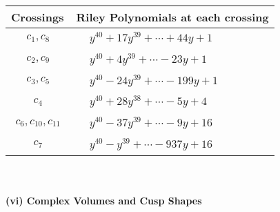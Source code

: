 \documentclass[1p]{elsarticle_modified}
\theoremstyle{definition}
\begin{document}
\begin{tabular}{m{50pt}|m{274pt}}
Crossings & \hspace{64pt}Riley Polynomials at each crossing \\
\hline $$\begin{aligned}c_{1},c_{8}\end{aligned}$$&$\begin{aligned}
&y^{40}+17 y^{39}+\cdots+44 y+1
\end{aligned}$\\
\hline $$\begin{aligned}c_{2},c_{9}\end{aligned}$$&$\begin{aligned}
&y^{40}+4 y^{39}+\cdots-23 y+1
\end{aligned}$\\
\hline $$\begin{aligned}c_{3},c_{5}\end{aligned}$$&$\begin{aligned}
&y^{40}-24 y^{39}+\cdots-199 y+1
\end{aligned}$\\
\hline $$\begin{aligned}c_{4}\end{aligned}$$&$\begin{aligned}
&y^{40}+28 y^{38}+\cdots-5 y+4
\end{aligned}$\\
\hline $$\begin{aligned}c_{6},c_{10},c_{11}\end{aligned}$$&$\begin{aligned}
&y^{40}-37 y^{39}+\cdots-9 y+16
\end{aligned}$\\
\hline $$\begin{aligned}c_{7}\end{aligned}$$&$\begin{aligned}
&y^{40}- y^{39}+\cdots-937 y+16
\end{aligned}$\\
\hline
\end{tabular}\\~\\
\newpage\flushleft \textbf{(vi) Complex Volumes and Cusp Shapes}
\end{document}
